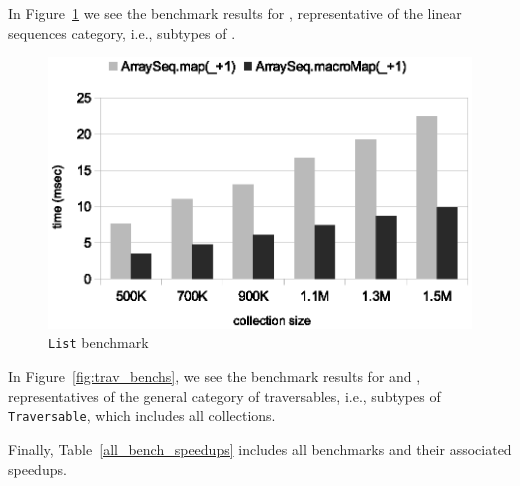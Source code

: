 In Figure~\ref{fig:lin_bench} we see the benchmark results for ,
representative of the linear sequences category, i.e., subtypes of .

\begin{figure}
\centering
\includegraphics[scale=0.7]{figures/arrayseq_bench.eps}
\caption[\texttt{List} benchmark]{\texttt{List} benchmark}
\label{fig:lin_bench}
\end{figure}

% 
% 


In Figure~\ref{fig:trav_benchs}, we see the benchmark results for
 and ,
representatives of the general category of traversables, i.e., subtypes of \texttt{Traversable}, which includes all collections.

Finally, Table~\ref{all_bench_speedups} includes all benchmarks and their associated speedups.

